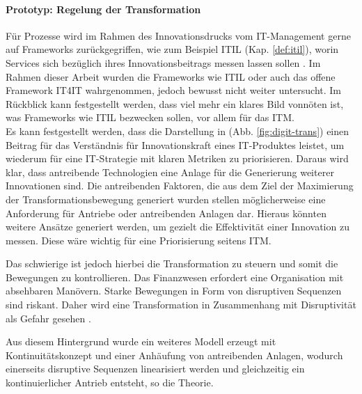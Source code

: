 \paragraph{Prototyp: Regelung der Transformation}
Für Prozesse wird im Rahmen des Innovationsdrucks vom IT-Management gerne auf Frameworks zurückgegriffen, wie zum Beispiel ITIL (Kap. \ref{def:itil}), worin Services sich bezüglich ihres Innovationsbeitrags messen lassen sollen \cite{Alt2017}. Im Rahmen dieser Arbeit wurden die Frameworks wie ITIL oder auch das offene Framework IT4IT wahrgenommen, jedoch bewusst nicht weiter untersucht. Im Rückblick kann festgestellt werden, dass viel mehr ein klares Bild vonnöten ist, was Frameworks wie ITIL bezwecken sollen, vor allem für das \ac{ITM}.
\medskip
\\
Es kann festgestellt werden, dass die Darstellung in (Abb. \ref{fig:digit-trans}) einen Beitrag für das Verständnis für Innovationskraft eines IT-Produktes leistet, um wiederum für eine IT-Strategie mit klaren Metriken zu priorisieren. Daraus wird klar, dass antreibende Technologien eine Anlage für die Generierung weiterer Innovationen sind. Die antreibenden Faktoren, die aus dem Ziel der Maximierung der Transformationsbewegung generiert wurden stellen möglicherweise eine Anforderung für Antriebe oder antreibenden Anlagen dar. Hieraus könnten weitere Ansätze generiert werden, um gezielt die Effektivität einer Innovation zu messen. Diese wäre wichtig für eine Priorisierung seitens \ac{ITM}.

Das schwierige ist jedoch hierbei die Transformation zu steuern und somit die Bewegungen zu kontrollieren. Das Finanzwesen erfordert eine Organisation mit absehbaren Manövern. Starke Bewegungen in Form von disruptiven Sequenzen sind riskant. Daher wird eine Transformation in Zusammenhang mit Disruptivität als Gefahr gesehen \cite{eba:2019}.

Aus diesem Hintergrund wurde ein weiteres Modell erzeugt mit Kontinuitätskonzept und einer Anhäufung von antreibenden Anlagen, wodurch einerseits disruptive Sequenzen linearisiert werden und gleichzeitig ein kontinuierlicher Antrieb entsteht, so die Theorie.

